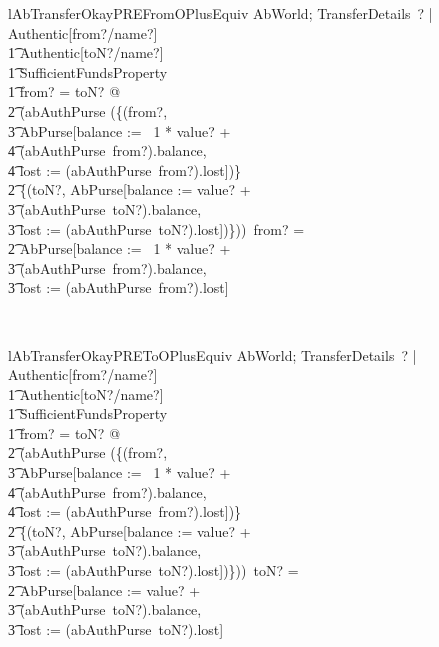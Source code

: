 \begin{LNewLemma}
\begin{theorem}{lAbTransferOkayPREFromOPlusEquiv}
    \forall  AbWorld; TransferDetails~? | Authentic[from?/name?] \\
        \t1 \land  Authentic[toN?/name?] \\
        \t1 \land  SufficientFundsProperty \\
        \t1 \land  \lnot  from? = toN? @ \\
            \t2 (abAuthPurse \oplus (\{(from?, \\
                \t3 \theta AbPurse[balance := \negate~1 * value? + \\
                    \t4 (abAuthPurse~from?).balance, \\
                    \t4 lost := (abAuthPurse~from?).lost])\} \\
            \t2 \cup \{(toN?, \theta AbPurse[balance := value? + \\
                \t3 (abAuthPurse~toN?).balance, \\
                \t3 lost := (abAuthPurse~toN?).lost])\}))~from? = \\
            \t2 \theta AbPurse[balance := \negate~1 * value? + \\
                \t3 (abAuthPurse~from?).balance, \\
                \t3 lost := (abAuthPurse~from?).lost]
\end{theorem}~\end{LNewLemma}
%
\begin{LNewLemma}
\begin{theorem}{lAbTransferOkayPREToOPlusEquiv}
    \forall  AbWorld; TransferDetails~? | Authentic[from?/name?] \\
        \t1 \land  Authentic[toN?/name?] \\
        \t1 \land  SufficientFundsProperty \\
        \t1 \land  \lnot  from? = toN? @ \\
            \t2 (abAuthPurse \oplus (\{(from?, \\
                \t3 \theta AbPurse[balance := \negate~1 * value? + \\
                    \t4 (abAuthPurse~from?).balance, \\
                    \t4 lost := (abAuthPurse~from?).lost])\} \\
            \t2 \cup \{(toN?, \theta AbPurse[balance := value? + \\
                \t3 (abAuthPurse~toN?).balance, \\
                \t3 lost := (abAuthPurse~toN?).lost])\}))~toN? = \\
            \t2 \theta AbPurse[balance := value? + \\
                \t3 (abAuthPurse~toN?).balance, \\
                \t3 lost := (abAuthPurse~toN?).lost]
\end{theorem}~\end{LNewLemma}
